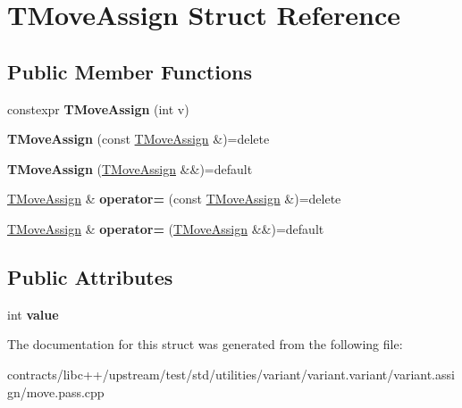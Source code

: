 \hypertarget{struct_t_move_assign}{}\section{T\+Move\+Assign Struct Reference}
\label{struct_t_move_assign}
\subsection*{Public Member Functions}
\begin{DoxyCompactItemize}
\item 
\mbox{\label{struct_t_move_assign_a896cbe6934099c7e7b091d1b92cf31f8}} 
constexpr {\bfseries T\+Move\+Assign} (int v)
\item 
\mbox{\label{struct_t_move_assign_a2cab8906382cb708842548090aa2b66b}} 
{\bfseries T\+Move\+Assign} (const \mbox{\hyperlink{struct_t_move_assign}{T\+Move\+Assign}} \&)=delete
\item 
\mbox{\label{struct_t_move_assign_a75a87ba3052300872991feecd30331e4}} 
{\bfseries T\+Move\+Assign} (\mbox{\hyperlink{struct_t_move_assign}{T\+Move\+Assign}} \&\&)=default
\item 
\mbox{\label{struct_t_move_assign_a7d9abd78df9e6c6747faa1d2fb10bd7f}} 
\mbox{\hyperlink{struct_t_move_assign}{T\+Move\+Assign}} \& {\bfseries operator=} (const \mbox{\hyperlink{struct_t_move_assign}{T\+Move\+Assign}} \&)=delete
\item 
\mbox{\label{struct_t_move_assign_aa833a54a37fe4d436652389455a1b10f}} 
\mbox{\hyperlink{struct_t_move_assign}{T\+Move\+Assign}} \& {\bfseries operator=} (\mbox{\hyperlink{struct_t_move_assign}{T\+Move\+Assign}} \&\&)=default
\end{DoxyCompactItemize}
\subsection*{Public Attributes}
\begin{DoxyCompactItemize}
\item 
\mbox{\label{struct_t_move_assign_a3959f79a51d926422cbdc293aa700256}} 
int {\bfseries value}
\end{DoxyCompactItemize}


The documentation for this struct was generated from the following file\+:\begin{DoxyCompactItemize}
\item 
contracts/libc++/upstream/test/std/utilities/variant/variant.\+variant/variant.\+assign/move.\+pass.\+cpp\end{DoxyCompactItemize}
